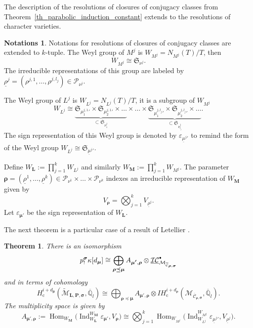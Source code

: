 \documentclass[JEP,XML,SOM,NoEqCountersInSection,Unicode,published]{cedram}
\newcommand{\sbullet}{{\scriptscriptstyle\bullet}}
\newcommand{\csbullet}{{\raisebox{1pt}{$\sbullet$}}}
\newcommand{\rc}{\mathrm{c}}
\let\epsilon\varepsilon
\theoremstyle{definition}
\newtheorem{notations}[definition]{Notations}
\theoremstyle{plain}
\newtheorem{theorem}[definition]{Theorem}
\DeclareMathOperator{\Hom}{Hom}
\DeclareMathOperator{\Ind}{Ind}
\newcommand{\qlbar}{\overline{\mathbb{Q}}_l}
\newcommand{\IH}{\mathit{IH}}
\newcommand{\Sym}{\mathfrak{S}}
\newcommand{\Part}{\mathcal{P}}
\newcommand{\uic}[1]{\underline{\mathcal{I C}}_{#1}^{\csbullet}}
\newcommand{\mlps}{\widetilde{\mathcal{M}}_{\boldsymbol{L},\boldsymbol{P},\boldsymbol{\sigma}}}
\begin{document}
The description of the resolutions of closures of conjugacy classes from Theorem~\ref{th_parabolic_induction_constant} extends to the resolutions of character varieties.
\begin{notations}
Notations for resolutions of closures of conjugacy classes are extended to $k$-tuple.
The Weyl group of $M^j$ is $W_{M^j}=N_{M^j}(T)/T$, then
\[
W_{M^j}\cong \Sym_{\nu^j}.
\]
The irreducible representations of this group are labeled by $\underline{\rho}^j=(\rho^{j,1},\dots,\rho^{j,l_j})\!\in\! \Part_{\nu^j}$.

The Weyl group of $L^j$ is $W_{L^j}=N_{L^j}(T)/T$, it is a subgroup of $W_{M^j}$
\[
W_{L^j} \cong \underbrace{\Sym_{{\mu^{j,1}_1}'}\times \Sym_{{\mu^{j,1}_2}'} \times \dots }_{\subset \Sym_{\nu^j_1}}\times \dots \times \underbrace{\Sym_{{\mu^{j,l_j}_1}'}\times \Sym_{{\mu^{j,l_j}_2}'} \times \dots}_{\subset \Sym_{\nu^j_{l_j}}}.
\]
The sign representation of this Weyl group is denoted by $\epsilon_{{\underline{\mu}^j}'}$ to remind the form of the Weyl group $W_{L^j}\cong \Sym_{{\underline{\mu}^j}'}$.

Define $W_{\boldsymbol{L}} := \prod_{j=1}^k W_{L^j} $ and similarly $W_{\boldsymbol{M}}:= \prod_{j=1}^k W_{M^j}$.
The parameter $\boldsymbol{\rho}=(\underline{\rho}^1,\dots,\underline{\rho}^k)\in \Part_{\nu^1}\times \dots \times \Part_{\nu^k}$ indexes an irreducible representation of $W_{\boldsymbol{M}}$ given by
\[
V_{\boldsymbol{\rho}}=\bigotimes_{j=1}^k V_{\underline{\rho}^j}.
\]
Let $\epsilon_{\boldsymbol{\mu'}}$ be the sign representation of $W_{\boldsymbol{L}}$.
\end{notations}

The next theorem is a particular case of a result of Letellier \cite[Th.\,5.4]{Letellier13}.
\begin{theorem}\label{th_coho_resol_char}
There is an isomorphism
\[
p^{\boldsymbol{\sigma}}_! \kappa [d_{\boldsymbol{\mu}}] \cong \bigoplus_{\boldsymbol{\rho\preceq \mu}} A_{\boldsymbol{\mu'},\boldsymbol{\rho}}\otimes \uic{\mathcal{M}_{\overline{\mathcal{C}}_{\boldsymbol{\rho},\boldsymbol{\sigma}}}}
\]
and in terms of cohomology
\begin{equation}\label{eq_cohomology_resol}
H^{i+d_{\boldsymbol{\mu}}}_\rc
(\mlps,\qlbar)
\cong
\bigoplus_{\boldsymbol{\rho\preceq \mu}}
A_{\boldsymbol{\mu'},\boldsymbol{\rho}}\otimes
\IH_{\rc}^{i+d_{\boldsymbol{\rho}}}(\mathcal{M}_{\overline{\mathcal{C}}_{\boldsymbol{\rho},\boldsymbol{\sigma}}},\qlbar).
\end{equation}
The multiplicity space is given by
\[
A_{\boldsymbol{\mu'},\boldsymbol{\rho}}:= \Hom_{W_{\boldsymbol{M}}}\bigl(\Ind_{W_{\boldsymbol{L}}}^{W_{\boldsymbol{M}}}\epsilon_{\boldsymbol{\mu'}}, V_{\boldsymbol{\rho}}\bigr) \cong \bigotimes_{j=1}^k \Hom_{W_{M^j}}\bigl(\Ind_{W_{L^j}}^{W_{M^j}} \epsilon_{{\underline{\mu}^j}'}, V_{\underline{\rho}^j}\bigr).
\]
\end{theorem}
\end{document}
